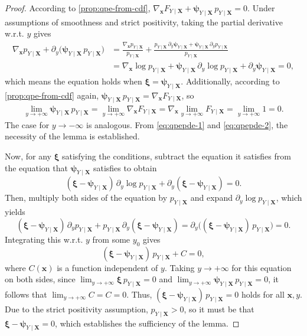 \documentclass{article}
\theoremstyle{plain}
\theoremstyle{definition}
\theoremstyle{remark}
\begin{document}
\qpepde*
\begin{proof}
According to \cref{prop:qpe-from-cdf}, $\nabla_{\bm{x}}F_{Y\mid\bm{X}}+\bm{\psi}_{Y\mid\bm{X}}\,p_{Y\mid\bm{X}}=0$. Under assumptions of smoothness and strict positivity, taking the partial derivative w.r.t. $y$ gives
\begin{align}
\label{eq:qpepde-1}
\nabla_{\bm{x}}p_{Y\mid\bm{X}}+\partial_y\big(\bm{\psi}_{Y\mid\bm{X}}\,p_{Y\mid\bm{X}}\big)&=\frac{\nabla_{\bm{x}}p_{Y\mid\bm{X}}}{p_{Y\mid\bm{X}}}+\frac{p_{Y\mid\bm{X}}\,\partial_y\bm{\psi}_{Y\mid\bm{X}}+\bm{\psi}_{Y\mid\bm{X}}\,\partial_yp_{Y\mid\bm{X}}}{p_{Y\mid\bm{X}}}\nonumber\\&=\nabla_{\bm{x}}\log p_{Y\mid\bm{X}}+\bm{\psi}_{Y\mid\bm{X}}\,\partial_y\log p_{Y\mid\bm{X}}+\partial_y\bm{\psi}_{Y\mid\bm{X}}=0,
\end{align}
which means the equation holds when $\bm{\xi}=\bm{\psi}_{Y\mid\bm{X}}$. Additionally, according to \cref{prop:qpe-from-cdf} again, $\bm{\psi}_{Y\mid\bm{X}}\,p_{Y\mid\bm{X}}=\nabla_{\bm{x}}F_{Y\mid\bm{X}}$, so
\begin{align}
\label{eq:qpepde-2}
\lim_{y\to+\infty}\bm{\psi}_{Y\mid\bm{X}}\,p_{Y\mid\bm{X}}=\lim_{y\to+\infty}\nabla_{\bm{x}}F_{Y\mid\bm{X}}=\nabla_{\bm{x}}\lim_{y\to+\infty}F_{Y\mid\bm{X}}=\lim_{y\to+\infty}1=0.
\end{align}
The case for $y\to-\infty$ is analogous. From \cref{eq:qpepde-1} and \cref{eq:qpepde-2}, the necessity of the lemma is established.

Now, for any $\bm{\xi}$ satisfying the conditions, subtract the equation it satisfies from the equation that $\bm{\psi}_{Y\mid\bm{X}}$ satisfies to obtain
\[(\bm{\xi}-\bm{\psi}_{Y\mid\bm{X}})\,\partial_y\log p_{Y\mid\bm{X}}+\partial_y(\bm{\xi}-\bm{\psi}_{Y\mid\bm{X}})=0.\]
Then, multiply both sides of the equation by $p_{Y\mid\bm{X}}$ and expand $\partial_y\log p_{Y\mid\bm{X}}$, which yields
\[(\bm{\xi}-\bm{\psi}_{Y\mid\bm{X}})\,\partial_yp_{Y\mid\bm{X}}+p_{Y\mid\bm{X}}\,\partial_y(\bm{\xi}-\bm{\psi}_{Y\mid\bm{X}})=\partial_y\big((\bm{\xi}-\bm{\psi}_{Y\mid\bm{X}})\,p_{Y\mid\bm{X}}\big)=0.\]
Integrating this w.r.t. $y$ from some $y_0$ gives
\[(\bm{\xi}-\bm{\psi}_{Y\mid\bm{X}})\,p_{Y\mid\bm{X}}+C=0,\]
where $C(\bm{x})$ is a function independent of $y$. Taking $y\to+\infty$ for this equation on both sides, since $\lim_{y\to+\infty}\bm{\xi}\,p_{Y\mid\bm{X}}=0$ and $\lim_{y\to+\infty}\bm{\psi}_{Y\mid\bm{X}}\,p_{Y\mid\bm{X}}=0$, it follows that $\lim_{y\to+\infty}C=C=0$. Thus, $(\bm{\xi}-\bm{\psi}_{Y\mid\bm{X}})\,p_{Y\mid\bm{X}}=0$ holds for all $\bm{x},y$. Due to the strict positivity assumption, $p_{Y\mid\bm{X}}>0$, so it must be that $\bm{\xi}-\bm{\psi}_{Y\mid\bm{X}}=0$, which establishes the sufficiency of the lemma.
\end{proof}
\end{document}
